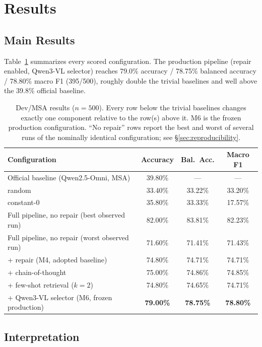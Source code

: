 \documentclass[11pt]{article}
\begin{document}
\section{Results}
\label{sec:results}

\subsection{Main Results}

Table~\ref{tab:results} summarizes every scored configuration. The production pipeline (repair enabled, Qwen3-VL selector) reaches 79.0\% accuracy / 78.75\% balanced accuracy / 78.80\% macro F1 (395/500), roughly double the trivial baselines and well above the 39.8\% official baseline.

\begin{table}[t]
  \centering
  \begin{tabular}{lccc}
    \toprule
    \textbf{Configuration} & \textbf{Accuracy} & \textbf{Bal.\ Acc.} & \textbf{Macro F1} \\
    \midrule
    Official baseline (Qwen2.5-Omni, MSA) & 39.80\% & --- & --- \\
    random & 33.40\% & 33.22\% & 33.20\% \\
    constant-0 & 35.80\% & 33.33\% & 17.57\% \\
    Full pipeline, no repair (best observed run) & 82.00\% & 83.81\% & 82.23\% \\
    Full pipeline, no repair (worst observed run) & 71.60\% & 71.41\% & 71.43\% \\
    + repair (M4, adopted baseline) & 74.80\% & 74.71\% & 74.71\% \\
    \quad + chain-of-thought & 75.00\% & 74.86\% & 74.85\% \\
    \quad + few-shot retrieval ($k=2$) & 74.80\% & 74.65\% & 74.71\% \\
    \quad + Qwen3-VL selector (M6, frozen production) & \textbf{79.00\%} & \textbf{78.75\%} & \textbf{78.80\%} \\
    \bottomrule
  \end{tabular}
  \caption{Dev/MSA results ($n=500$). Every row below the trivial baselines changes exactly one component relative to the row(s) above it. M6 is the frozen production configuration. ``No repair'' rows report the best and worst of several runs of the nominally identical configuration; see \S\ref{sec:reproducibility}.}
  \label{tab:results}
\end{table}

\subsection{Interpretation}
\label{sec:interpretation}
\end{document}
